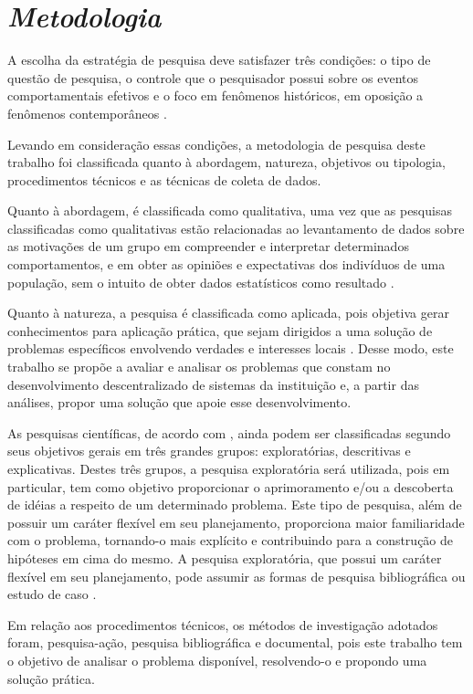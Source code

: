 \section{\textit{Metodologia}}

A escolha da estratégia de pesquisa deve satisfazer três condições: o tipo de questão de pesquisa, o controle que o pesquisador possui sobre os eventos comportamentais efetivos e o foco em fenômenos históricos, em oposição a fenômenos contemporâneos \cite{yin2001estudo}.

Levando em consideração essas condições, a metodologia de pesquisa deste trabalho foi classificada quanto à abordagem, natureza, objetivos ou tipologia, procedimentos técnicos e as técnicas de coleta de dados.

Quanto à abordagem, é classificada como qualitativa, uma vez que as pesquisas
classificadas como qualitativas estão relacionadas ao levantamento de dados sobre as motivações de um grupo em compreender e interpretar determinados comportamentos, e em obter as opiniões e expectativas dos indivíduos de uma população, sem o intuito de obter dados estatísticos como resultado  \cite{gunther2006pesquisa,moresi2003metodologia}.

Quanto à natureza, a pesquisa é classificada como aplicada, pois objetiva gerar conhecimentos para aplicação prática, que sejam dirigidos a uma solução de problemas específicos envolvendo verdades e interesses locais \cite{gil2002}. Desse modo, este trabalho se propõe a avaliar e analisar os problemas que constam no desenvolvimento descentralizado de sistemas da instituição e, a partir das análises, propor uma solução que apoie esse desenvolvimento.

As pesquisas científicas, de acordo com , ainda podem ser classificadas segundo seus objetivos gerais em três grandes grupos: exploratórias, descritivas e explicativas. Destes três grupos, a pesquisa exploratória será utilizada, pois em particular, tem como objetivo proporcionar o aprimoramento e/ou a descoberta de idéias a respeito de um determinado problema. Este tipo de pesquisa, além de possuir um caráter flexível em seu planejamento, proporciona maior familiaridade com o problema, tornando-o mais explícito e contribuindo para a construção de hipóteses em cima do mesmo. A pesquisa exploratória, que possui um caráter flexível em seu planejamento, pode assumir as formas de pesquisa bibliográfica ou estudo de caso \cite{gil2002}.

Em relação aos procedimentos técnicos, os métodos de investigação adotados foram, pesquisa-ação, pesquisa bibliográfica e documental, pois este trabalho tem o objetivo de analisar o problema disponível, resolvendo-o e propondo uma solução prática.

